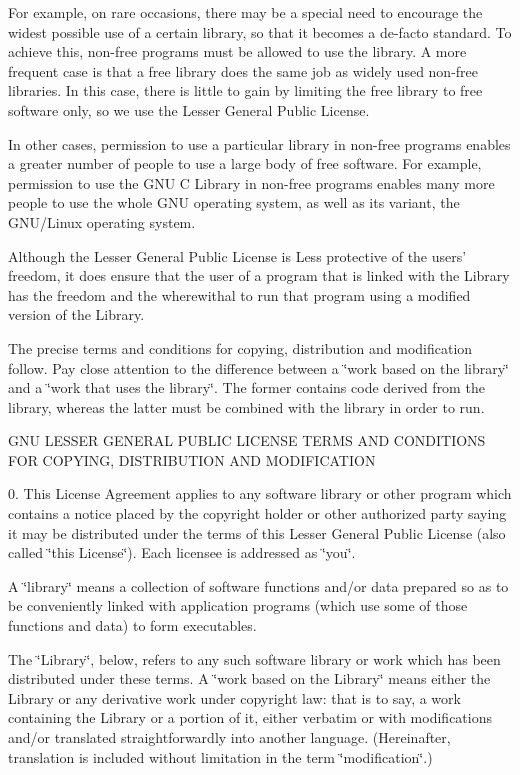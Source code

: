 For example, on rare occasions, there may be a special need to encourage the widest possible use of a certain library, so that it becomes a de-\/facto standard. To achieve this, non-\/free programs must be allowed to use the library. A more frequent case is that a free library does the same job as widely used non-\/free libraries. In this case, there is little to gain by limiting the free library to free software only, so we use the Lesser General Public License.

In other cases, permission to use a particular library in non-\/free programs enables a greater number of people to use a large body of free software. For example, permission to use the G\-N\-U C Library in non-\/free programs enables many more people to use the whole G\-N\-U operating system, as well as its variant, the G\-N\-U/\-Linux operating system.

Although the Lesser General Public License is Less protective of the users' freedom, it does ensure that the user of a program that is linked with the Library has the freedom and the wherewithal to run that program using a modified version of the Library.

The precise terms and conditions for copying, distribution and modification follow. Pay close attention to the difference between a \char`\"{}work based on the library\char`\"{} and a \char`\"{}work that uses the library\char`\"{}. The former contains code derived from the library, whereas the latter must be combined with the library in order to run.

G\-N\-U L\-E\-S\-S\-E\-R G\-E\-N\-E\-R\-A\-L P\-U\-B\-L\-I\-C L\-I\-C\-E\-N\-S\-E T\-E\-R\-M\-S A\-N\-D C\-O\-N\-D\-I\-T\-I\-O\-N\-S F\-O\-R C\-O\-P\-Y\-I\-N\-G, D\-I\-S\-T\-R\-I\-B\-U\-T\-I\-O\-N A\-N\-D M\-O\-D\-I\-F\-I\-C\-A\-T\-I\-O\-N

0. This License Agreement applies to any software library or other program which contains a notice placed by the copyright holder or other authorized party saying it may be distributed under the terms of this Lesser General Public License (also called \char`\"{}this License\char`\"{}). Each licensee is addressed as \char`\"{}you\char`\"{}.

A \char`\"{}library\char`\"{} means a collection of software functions and/or data prepared so as to be conveniently linked with application programs (which use some of those functions and data) to form executables.

The \char`\"{}\-Library\char`\"{}, below, refers to any such software library or work which has been distributed under these terms. A \char`\"{}work based on the
\-Library\char`\"{} means either the Library or any derivative work under copyright law\-: that is to say, a work containing the Library or a portion of it, either verbatim or with modifications and/or translated straightforwardly into another language. (Hereinafter, translation is included without limitation in the term \char`\"{}modification\char`\"{}.)

